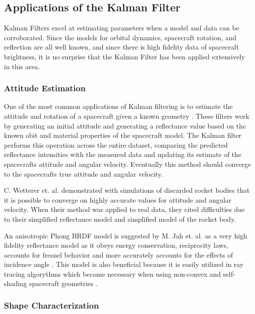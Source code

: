 \documentclass{article}
\begin{document}
\subsection{Applications of the Kalman Filter}

Kalman Filters excel at estimating parameters when a model and data can be corroborated. Since the models for orbital dynamics, spacecraft rotation, and reflection are all well known, and since there is high fidelity data of spacecraft brightness, it is no surprise that the Kalman Filter has been applied extensively in this area.

\subsubsection{Attitude Estimation}
One of the most common applications of Kalman filtering is to estimate the attitude and rotation of a spacecraft given a known geometry \cite{AttitudeEstimationFromLightCurve} \cite{LINARES20141} \cite{SpaceObjectCharacterization}. These filters work by generating an initial attitude and generating a reflectance value based on the known obit and material properties of the spacecraft model. The Kalman filter performs this operation across the entire dataset, comparing the predicted reflectance intensities with the measured data and updating its estimate of the spacecrafts attitude and angular velocity. Eventually this method should converge to the spacecrafts true attitude and angular velocity.

C. Wetterer et. al. \cite{AttitudeEstimationFromLightCurve} demonstrated with simulations of discarded rocket bodies that it is possible to converge on highly accurate values for attitude and angular velocity. When their method was applied to real data, they cited difficulties due to their simplified reflectance model and simplified model of the rocket body.

An anisotropic Phong BRDF model is suggested by M. Jah et. al. as a very high fidelity reflectance model as it obeys energy conservation, reciprocity laws, accounts for fresnel behavior and more accurately accounts for the effects of incidence angle \cite{StateAndParameter}. This model is also beneficial because it is easily utilized in ray tracing algorythms \cite{Ashikhmin} which become necessary when using non-convex and self-shading spacecraft geometries \cite{Kaasalainen}.

\subsubsection{Shape Characterization}
\end{document}
